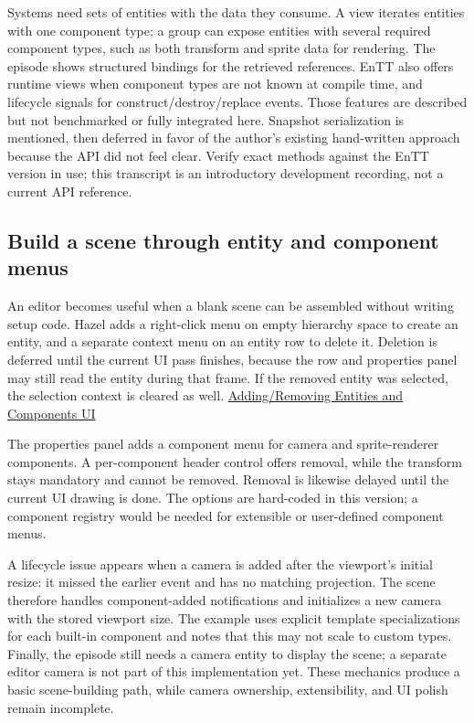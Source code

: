 Systems need sets of entities with the data they consume. A view iterates entities with one component type; a group can expose entities with several required component types, such as both transform and sprite data for rendering. The episode shows structured bindings for the retrieved references. EnTT also offers runtime views when component types are not known at compile time, and lifecycle signals for construct/destroy/replace events. Those features are described but not benchmarked or fully integrated here. Snapshot serialization is mentioned, then deferred in favor of the author's existing hand-written approach because the API did not feel clear. Verify exact methods against the EnTT version in use; this transcript is an introductory development recording, not a current API reference.

\subsection{Build a scene through entity and component menus}\label{06-engine-ii-ch031-build-a-scene-through-entity-and-component-menus}

\hypertarget{06-engine-ii-ch031-build-a-scene-through-entity-and-component-menus}{}

An editor becomes useful when a blank scene can be assembled without writing setup code. Hazel adds a right-click menu on empty hierarchy space to create an entity, and a separate context menu on an entity row to delete it. Deletion is deferred until the current UI pass finishes, because the row and properties panel may still read the entity during that frame. If the removed entity was selected, the selection context is cleared as well. \href{https://www.youtube.com/watch?v=PsyGmsIgp9M}{Adding/Removing Entities and Components UI}

The properties panel adds a component menu for camera and sprite-renderer components. A per-component header control offers removal, while the transform stays mandatory and cannot be removed. Removal is likewise delayed until the current UI drawing is done. The options are hard-coded in this version; a component registry would be needed for extensible or user-defined component menus.

A lifecycle issue appears when a camera is added after the viewport's initial resize: it missed the earlier event and has no matching projection. The scene therefore handles component-added notifications and initializes a new camera with the stored viewport size. The example uses explicit template specializations for each built-in component and notes that this may not scale to custom types. Finally, the episode still needs a camera entity to display the scene; a separate editor camera is not part of this implementation yet. These mechanics produce a basic scene-building path, while camera ownership, extensibility, and UI polish remain incomplete.

